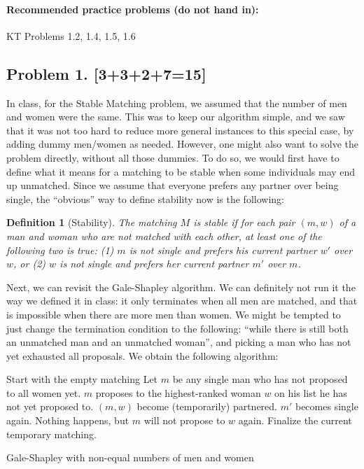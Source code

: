 \documentclass[10pt]{article}
\newtheorem{definition}{Definition}
\begin{document}
\paragraph{Recommended practice problems (do not hand in):} KT Problems 1.2, 1.4, 1.5, 1.6


\newpage

\subsection*{Problem 1. [3+3+2+7=15]}

  In class, for the Stable Matching problem, we assumed that the number of men and women were the same. This was to keep our algorithm simple, and we saw that it was not too hard to reduce more general instances to this special case, by adding dummy men/women as needed. However, one might also want to solve the problem directly, without all those dummies. To do so, we would first have to define what it means for a matching to be stable when some individuals may end up unmatched. Since we assume that everyone prefers any partner over being single, the ``obvious'' way to define stability now is the following:

\begin{definition}[Stability]
  The matching $M$ is \emph{stable} if for each pair $(m,w)$ of a man and woman who are not matched with each other, at least one of the following two is true: (1) $m$ is not single and prefers his current partner $w'$ over $w$, or (2) $w$ is not single and prefers her current partner $m'$ over $m$.
\end{definition}

Next, we can revisit the Gale-Shapley algorithm. We can definitely not run it the way we defined it in class: it only terminates when all men are matched, and that is impossible when there are more men than women. We might be tempted to just change the termination condition to the following: ``while there is still both an unmatched man and an unmatched woman'', and picking a man who has not yet exhausted all proposals. We obtain the following algorithm:

\begin{algorithm}[htb]
  \begin{algorithmic}
    \STATE Start with the empty matching
      \STATE Let $m$ be any single man who has not proposed to all women yet.
      \STATE $m$ proposes to the highest-ranked woman $w$ on his list he has not yet proposed to.
        \STATE $(m,w)$ become (temporarily) partnered.
          \STATE $m'$ becomes single again.
        \ENDIF
      \ELSE
        \STATE Nothing happens, but $m$ will not propose to $w$ again.  
      \ENDIF
     \ENDWHILE
     \STATE Finalize the current temporary matching.
  \end{algorithmic}
\caption{Gale-Shapley with non-equal numbers of men and women \label{alg:GS-modified}}
\end{algorithm}
\end{document}
